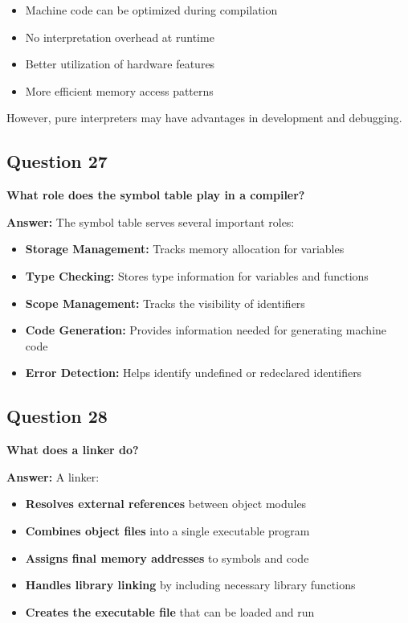 \documentclass[11pt,a4paper]{article}
\begin{document}
\begin{itemize}
\item Machine code can be optimized during compilation
\item No interpretation overhead at runtime
\item Better utilization of hardware features
\item More efficient memory access patterns
\end{itemize}

However, pure interpreters may have advantages in development and debugging.

\subsection{Question 27}
\textbf{What role does the symbol table play in a compiler?}

\textbf{Answer:}
The symbol table serves several important roles:

\begin{itemize}
\item \textbf{Storage Management:} Tracks memory allocation for variables
\item \textbf{Type Checking:} Stores type information for variables and functions
\item \textbf{Scope Management:} Tracks the visibility of identifiers
\item \textbf{Code Generation:} Provides information needed for generating machine code
\item \textbf{Error Detection:} Helps identify undefined or redeclared identifiers
\end{itemize}

\subsection{Question 28}
\textbf{What does a linker do?}

\textbf{Answer:}
A linker:

\begin{itemize}
\item \textbf{Resolves external references} between object modules
\item \textbf{Combines object files} into a single executable program
\item \textbf{Assigns final memory addresses} to symbols and code
\item \textbf{Handles library linking} by including necessary library functions
\item \textbf{Creates the executable file} that can be loaded and run
\end{itemize}
\end{document}

